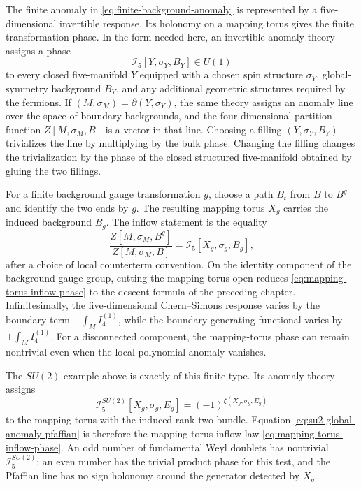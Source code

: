 The finite anomaly in \eqref{eq:finite-background-anomaly} is represented by a
five-dimensional invertible response.  Its holonomy on a mapping torus gives
the finite transformation phase.  In the form needed here, an invertible
anomaly theory assigns a phase
\[
  \mathcal I_5[Y,\sigma_Y,B_Y]\in U(1)
\]
to every closed five-manifold \(Y\) equipped with a chosen spin structure
\(\sigma_Y\), global-symmetry background \(B_Y\), and any additional
geometric structures required by the fermions.  If
\((M,\sigma_M)=\partial(Y,\sigma_Y)\), the same theory assigns an anomaly line
over the space of boundary backgrounds, and the four-dimensional partition
function \(Z[M,\sigma_M,B]\) is a vector in that line.  Choosing a filling
\((Y,\sigma_Y,B_Y)\) trivializes the line by multiplying by the bulk phase.
Changing the filling changes the trivialization by the phase of the closed
structured five-manifold obtained by gluing the two fillings.

For a finite background gauge transformation \(g\), choose a path \(B_t\) from
\(B\) to \(B^g\) and identify the two ends by \(g\).  The resulting mapping
torus \(X_g\) carries the induced background \(B_g\).  The inflow statement is
the equality
\begin{equation}
  \frac{Z[M,\sigma_M,B^g]}{Z[M,\sigma_M,B]}
  =
  \mathcal I_5[X_g,\sigma_g,B_g],
  \label{eq:mapping-torus-inflow-phase}
\end{equation}
after a choice of local counterterm convention.  On the identity component of
the background gauge group, cutting the mapping torus open reduces
\eqref{eq:mapping-torus-inflow-phase} to the descent formula of the preceding
chapter.  Infinitesimally, the five-dimensional Chern--Simons response varies
by the boundary term \(-\int_M I_4^{(1)}\), while the boundary generating
functional varies by \(+\int_M I_4^{(1)}\).  For a disconnected component, the
mapping-torus phase can remain nontrivial even when the local polynomial
anomaly vanishes.

The \(SU(2)\) example above is exactly of this finite type.  Its anomaly
theory assigns
\begin{equation}
  \mathcal I^{SU(2)}_5[X_g,\sigma_g,E_g]
  =
  (-1)^{\zeta(X_g,\sigma_g,E_g)}
  \label{eq:su2-invertible-anomaly-theory}
\end{equation}
to the mapping torus with the induced rank-two bundle.  Equation
\eqref{eq:su2-global-anomaly-pfaffian} is therefore the mapping-torus inflow
law \eqref{eq:mapping-torus-inflow-phase}.  An odd number of fundamental Weyl
doublets has nontrivial \(\mathcal I^{SU(2)}_5\); an even number has the
trivial product phase for this test, and the Pfaffian line has no sign
holonomy around the generator detected by \(X_g\).

